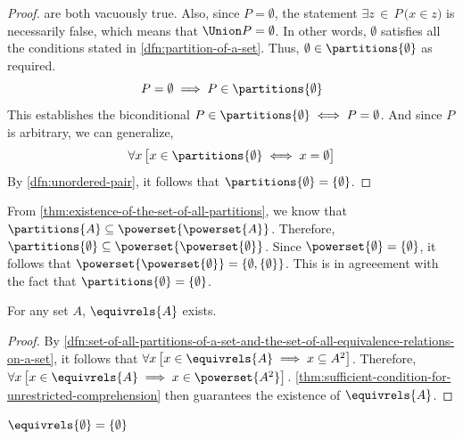 \begin{proof}
    are both vacuously true. Also, since \( P = \emptyset \), the statement \( \exists z\,{\in}\,P \, \big( x \in z \big) \)
    is necessarily false, which means that \( \Union P = \emptyset \). In other words, \( \emptyset \) satisfies all the conditions
    stated in \cref{dfn:partition-of-a-set}. Thus, \( \emptyset \in \partitions{\emptyset} \) as required.
    \begin{equation*}
        P = \emptyset \implies P \in \partitions{\emptyset}
    \end{equation*}
    This establishes the biconditional \( P \in \partitions{\emptyset} \iff P = \emptyset \). And since \( P \) is arbitrary,
    we can generalize,
    \begin{equation*}
        \forall x \, \big[ x \in \partitions{\emptyset} \iff x = \emptyset \big]
    \end{equation*}
    By \cref{dfn:unordered-pair}, it follows that \( \partitions{\emptyset} = \mleft\{ \emptyset \mright\} \).
\end{proof}

\begin{rem}
    From \cref{thm:existence-of-the-set-of-all-partitions}, we know that \( \partitions{A} \subseteq \powerset{\powerset{A}} \).
    Therefore, \( \partitions{\emptyset} \subseteq \powerset{\powerset{\emptyset}} \). Since \( \powerset{\emptyset} = \mleft\{ \emptyset \mright\} \),
    it follows that \( \powerset{\powerset{\emptyset}} = \mleft\{ \emptyset, \mleft\{ \emptyset \mright\} \mright\} \). This is in agreeement with
    the fact that \( \partitions{\emptyset} = \mleft\{ \emptyset \mright\} \).
\end{rem}

\begin{thm}
    \label{thm:existence-of-the-set-of-all-equivalence-relations}
    For any set \( A \), \( \equivrels{A} \) exists.
\end{thm}

\begin{proof}
    By \cref{dfn:set-of-all-partitions-of-a-set-and-the-set-of-all-equivalence-relations-on-a-set},
    it follows that \( \forall x \, \big[ x \in \equivrels{A} \implies x \subseteq A^{2} \big] \).
    Therefore, \( \forall x \, \big[ x \in \equivrels{A} \implies x \in \powerset{A^{2}} \big] \).
    \cref{thm:sufficient-condition-for-unrestricted-comprehension} then guarantees the existence
    of \( \equivrels{A} \).
\end{proof}

\begin{thm}
    \label{thm:the-only-equivalence-relation-on-the-empty-set-is-the-empty-set}
    \( \equivrels{\emptyset} = \mleft\{ \emptyset \mright\} \)
\end{thm}

